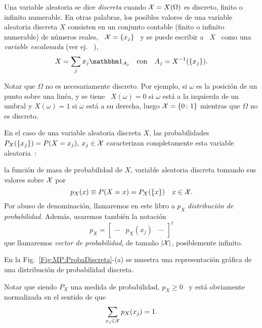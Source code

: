\begin{definicion}
\label{Def:MP:VariableAleatoriaDiscreta}
%
  Una  variable aleatoria se  dice {\it  discreta} cuando  $\mathcal{X} =  X(\Omega)$ es
  discreto,  finito o  infinito numerable.
  En otras palabras, los posibles valores de una variable aleatoria discreta $X$
  consisten en un  conjunto contable (finito o infinito  numerable) de n\'umeros
  reales, \  $\mathcal{X} = \{  x_j \}$ \  y se puede  escribir a \  $X$ \ como  una {\it
    variable escalonada} (ver ej.  ~\cite{AthLah06, HogMck13}),
  \[
  X = \sum_j x_j \un_{A_j} \quad \mbox{con} \quad A_j = X^{-1}(\{ x_j \}).
  \]
\end{definicion}
%
\noindent Notar  que $\Omega$  no es necesariamente  discreto.  Por  ejemplo, si
$\omega$ es la posici\'on de un punto sobre una lin\'ea, y se tiene \ $X(\omega)
=  0$ si  $\omega$ est\'a  a la  izquierda de  un umbral  y $X(\omega)  =  1$ si
$\omega$ est\'a  a su  derecha, luego  $\mathcal{X} =  \{ 0 \, ; \,  1 \}$  mientras que
$\Omega$ no es discreto.

En el  caso de una variable  aleatoria discreta $X$,  las probabilidades $P_X(\{
x_j \})  = P(X = x_j), \:  x_j \in \mathcal{X}$ caracterizan  completamente esta variable
aleatoria~\cite{AthLah06, HogMck13}:
%
\begin{definicion}
\label{Def:MP:MasaProbabilidad}
%
   la  funci\'on  de  masa de  probabilidad  de $X$,  variable
  aleatoria discreta tomando sus valores sobre $\mathcal{X}$ por
  \[
  p_X(x) \equiv P(X = x) = P_X( \{ x\} ) \quad x \in \mathcal{X}.
  \]
  Por   abuso  de   denominaci\'on,  llamaremos   en  este   libro a   $p_X$  {\it
    distribuci\'on de probabilidad}. Adem\'as, usaremos tambi\'en la notaci\'on
  \[
  p_X = \begin{bmatrix} \cdots & p_X(x_j) & \cdots \end{bmatrix}^t
  \]
  que llamaremos {\it vector  de probabilidad}, de tama\~no $|\mathcal{X}|$, posiblemente
  infinito.
\end{definicion}
%
En  la  Fig.~\ref{Fig:MP:ProbaDiscreta}-(a)   se  muestra  una  representaci\'on
gr\'afica de una distribuci\'on de probabilidad discreta.

Notar  que siendo  $P_X$ una  medida de  probabilidad, $p_X  \ge 0$  \  y est\'a
obviamente normalizada en el sentido de que
%
\[
\sum_{x_j \in \mathcal{X}} p_X(x_j) = 1.
\]
%

